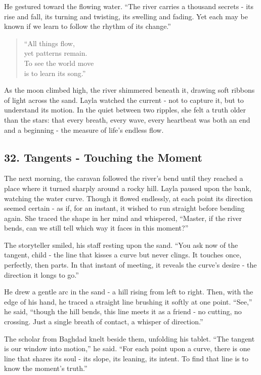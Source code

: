 \documentclass[
  letterpaper,
  DIV=11,
  numbers=noendperiod]{scrreprt}
\begin{document}
He gestured toward the flowing water. ``The river carries a thousand
secrets - its rise and fall, its turning and twisting, its swelling and
fading. Yet each may be known if we learn to follow the rhythm of its
change.''

\begin{quote}
``All things flow,\\
yet patterns remain.\\
To see the world move\\
is to learn its song.''
\end{quote}

As the moon climbed high, the river shimmered beneath it, drawing soft
ribbons of light across the sand. Layla watched the current - not to
capture it, but to understand its motion. In the quiet between two
ripples, she felt a truth older than the stars: that every breath, every
wave, every heartbeat was both an end and a beginning - the measure of
life's endless flow.

\subsection{32. Tangents - Touching the
Moment}\label{tangents---touching-the-moment}

The next morning, the caravan followed the river's bend until they
reached a place where it turned sharply around a rocky hill. Layla
paused upon the bank, watching the water curve. Though it flowed
endlessly, at each point its direction seemed certain - as if, for an
instant, it wished to run straight before bending again. She traced the
shape in her mind and whispered, ``Master, if the river bends, can we
still tell which way it faces in this moment?''

The storyteller smiled, his staff resting upon the sand. ``You ask now
of the tangent, child - the line that kisses a curve but never clings.
It touches once, perfectly, then parts. In that instant of meeting, it
reveals the curve's desire - the direction it longs to go.''

He drew a gentle arc in the sand - a hill rising from left to right.
Then, with the edge of his hand, he traced a straight line brushing it
softly at one point. ``See,'' he said, ``though the hill bends, this
line meets it as a friend - no cutting, no crossing. Just a single
breath of contact, a whisper of direction.''

The scholar from Baghdad knelt beside them, unfolding his tablet. ``The
tangent is our window into motion,'' he said. ``For each point upon a
curve, there is one line that shares its soul - its slope, its leaning,
its intent. To find that line is to know the moment's truth.''
\end{document}
